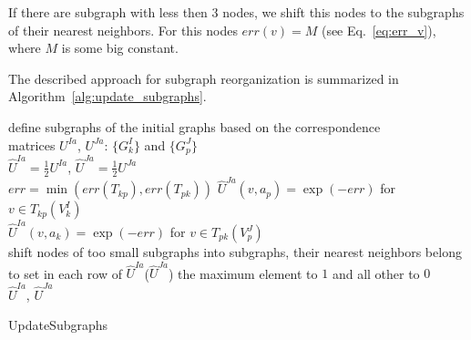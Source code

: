 If there are subgraph with less then $3$ nodes, we shift this nodes to the subgraphs of their nearest neighbors. For this nodes $err(v)=M$ (see Eq.~\ref{eq:err_v}), where $M$ is some big constant. 

The described approach for subgraph reorganization is summarized in Algorithm~\ref{alg:update_subgraphs}.

\vspace{20pt}
\begin{algorithm}[H]
	\nl define subgraphs of the initial graphs based on the correspondence \\
	matrices $U^{Ia}$, $U^{Ja}$: $\{G^I_k\}$ and  $\{G^J_p\}$ \\
	\nl $\hat{U}^{Ia} = \frac{1}{2}U^{Ia}$, $\hat{U}^{Ja} = \frac{1}{2}U^{Ja}$ \\
	\nl {}
			{
				{ 
			      $err = \min(err(T_{kp}), err(T_{pk}))$ 
			         {
			          $\hat{U}^{Ja}(v, a_p) = \exp(-err)$ for $v\in T_{kp}(V^{I}_k)$ \\
   		 	          $\hat{U}^{Ia}(v, a_k) = \exp(-err)$ for $v\in T_{pk}(V^{J}_p)$ \\
   		 	         }
   		 	    }
    		 	{shift nodes of too small subgraphs into subgraphs, their nearest neighbors belong to} 
		    }			
	\nl  set in each row of  $\hat{U}^{Ia}$($\hat{U}^{Ja}$) the maximum element to $1$ and all other to $0$\\
	\Return $\hat{U}^{Ia}$, $\hat{U}^{Ja}$
	
	\caption{UpdateSubgraphs}    \label{alg:update_subgraphs}
\end{algorithm}

